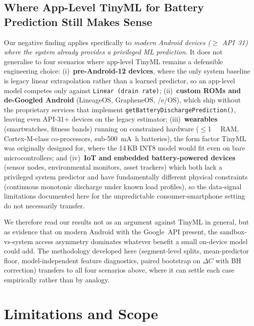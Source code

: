 \documentclass[conference]{IEEEtran}
\begin{document}
\subsection{Where App-Level TinyML for Battery Prediction Still Makes Sense}
\label{sec:where-tinyml}
Our negative finding applies specifically to \emph{modern Android
devices ($\geq$ API~31) where the system already provides a privileged
ML prediction}. It does not generalise to four scenarios where
app-level TinyML remains a defensible engineering choice:
(i)~\textbf{pre-Android-12 devices}, where the only system baseline is
legacy linear extrapolation rather than a learned predictor, so an
app-level model competes only against \texttt{Linear (drain rate)};
(ii)~\textbf{custom ROMs and de-Googled Android} (LineageOS,
GrapheneOS, /e/OS), which ship without the proprietary services that
implement \texttt{getBatteryDischargePrediction()}, leaving even
API-31+ devices on the legacy estimator;
(iii)~\textbf{wearables} (smartwatches, fitness bands) running on
constrained hardware ($\leq$\SI{1}{\giga\byte} RAM, Cortex-M-class
co-processors, sub-\SI{500}{\milli\ampere\hour} batteries), the
form factor TinyML was originally designed for, where the 14\,KB
INT8 model would fit even on bare microcontrollers; and
(iv)~\textbf{IoT and embedded battery-powered
devices}~\cite{banbury2021mlperf,alajlan2022tinyml} (sensor nodes,
environmental monitors, asset trackers)
which both lack a privileged system predictor and have fundamentally
different physical constraints (continuous monotonic discharge under
known load profiles), so the data-signal limitations documented here
for the unpredictable consumer-smartphone setting do not necessarily
transfer.

We therefore read our results not as an argument against TinyML in
general, but as evidence that on modern Android with the Google~API
present, the sandbox-vs-system access asymmetry dominates whatever
benefit a small on-device model could add. The methodology developed
here (segment-level splits, mean-predictor floor,
model-independent feature diagnostics, paired bootstrap on $\Delta C$
with BH correction) transfers to all four scenarios above, where it
can settle each case empirically rather than by analogy.

\section{Limitations and Scope}
\label{sec:limitations}
\end{document}
